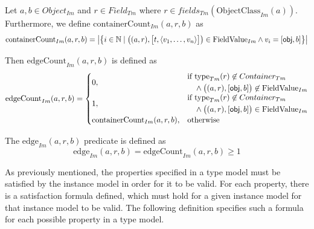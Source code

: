 \begin{defin}
\label{defin:formalisations:ecore_formalisation:instance_models:value_edges}
Let $a, b \in Object_{Im}$ and $r \in Field_{Tm}$ where $r \in fields_{Tm}(\mathrm{ObjectClass}_{Im}(a))$. Furthermore, we define $\mathrm{containerCount}_{Im}(a, r, b)$ as
\begin{equation*}
    \mathrm{containerCount}_{Im}(a, r, b) = \big|\big\{ i \in \mathbb{N} \mid \big( (a, r), \big[ t, \langle v_1, \dotsc, v_n \rangle \big] \big) \in \mathrm{FieldValue}_{Im} \land v_i = [ \mathsf{obj}, b ] \big\}\big|
\end{equation*}

Then $\mathrm{edgeCount}_{Im}(a, r, b)$ is defined as
\begin{equation*}
    \mathrm{edgeCount}_{Im}(a, r, b) = 
    \begin{cases}
        0, & \begin{aligned} 
            \text{if } &\mathrm{type}_{Tm}(r) \not\in Container_{Tm} \\&\land \big( (a, r), [ \mathsf{obj}, b ] \big) \not\in \mathrm{FieldValue}_{Im}
        \end{aligned}\\
        1, & \begin{aligned} 
            \text{if } &\mathrm{type}_{Tm}(r) \not\in Container_{Tm} \\&\land \big( (a, r), [ \mathsf{obj}, b ] \big) \in \mathrm{FieldValue}_{Im}
        \end{aligned}\\
        \mathrm{containerCount}_{Im}(a, r, b), & \text{otherwise}
    \end{cases}
\end{equation*}

The $\mathrm{edge}_{Im}(a, r, b)$ predicate is defined as
\begin{equation*}
    \mathrm{edge}_{Im}(a, r, b) = \mathrm{edgeCount}_{Im}(a, r, b) \geq 1
\end{equation*}
\end{defin}

As previously mentioned, the properties specified in a type model must be satisfied by the instance model in order for it to be valid. For each property, there is a satisfaction formula defined, which must hold for a given instance model for that instance model to be valid. The following definition specifies such a formula for each possible property in a type model.


